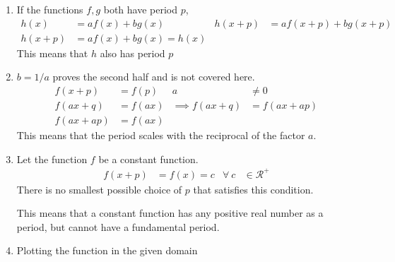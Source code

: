\begin{enumerate}
    \item If the functions $ f, g $ both have period $ p $,
          \begin{align}
              h(x)     & = af(x) + bg(x)        &
              h(x + p) & = af(x + p) + bg(x+ p)   \\
              h(x + p) & = af(x) + bg(x) = h(x)
          \end{align}
          This means that $ h $ also has period $ p $

    \item $ b = 1/a  $ proves the second half and is not covered here.
          \begin{align}
              f(x + p)           & = f(p)       &
              a                  & \neq 0         \\
              f(ax + q)          & = f(ax)      &
              \implies f(ax + q) & = f(ax + ap)   \\
              f(ax + ap)         & = f(ax)
          \end{align}
          This means that the period scales with the reciprocal of the factor $ a $.

    \item Let the function $ f $ be a constant function.
          \begin{align}
              f(x + p)   & = f(x) = c        &
              \forall\ c & \in \mathcal{R}^+
          \end{align}
          There is no smallest possible choice of $ p $ that satisfies this condition.
          \par This means that a constant function has any positive real number as a
          period, but cannot have a fundamental period.

    \item Plotting the function in the given domain
          \begin{figure}[H]
              \centering
          \end{figure}


\end{enumerate}
